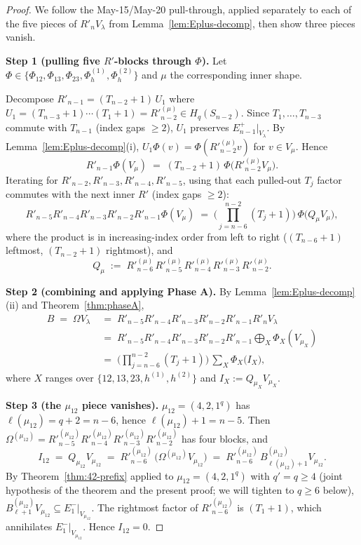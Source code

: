 \documentclass[11pt]{article}
\theoremstyle{definition}
\newcommand{\Hq}{H_q}
\newcommand{\Om}{\Omega}
\newcommand{\Rp}{{R'}}
\begin{document}
\begin{proof}
We follow the May-15/May-20 pull-through, applied separately to each
of the five pieces of $\Rp_n V_\lambda$ from
Lemma~\ref{lem:Eplus-decomp}, then show three pieces vanish.

\medskip\textbf{Step 1 (pulling five $\Rp$-blocks through $\Phi$).}
Let $\Phi \in \{\Phi_{12}, \Phi_{13}, \Phi_{23}, \Phi_h^{(1)},
\Phi_h^{(2)}\}$ and $\mu$ the corresponding inner shape.

Decompose $\Rp_{n-1} = (T_{n-2}+1)\,U_1$ where $U_1 = (T_{n-3}+1)\cdots
(T_1+1) = \Rp_{n-2}^{(\mu)} \in \Hq(S_{n-2})$.  Since $T_1, \ldots,
T_{n-3}$ commute with $T_{n-1}$ (index gaps $\ge 2$), $U_1$ preserves
$E_{n-1}^+|_{V_\lambda}$.  By Lemma~\ref{lem:Eplus-decomp}(i),
$U_1 \Phi(v) = \Phi(\Rp_{n-2}^{(\mu)} v)$ for $v \in V_\mu$.  Hence
\[
   \Rp_{n-1}\Phi(V_\mu)
   \;=\; (T_{n-2}+1)\,\Phi\bigl(\Rp_{n-2}^{(\mu)} V_\mu\bigr).
\]
Iterating for $\Rp_{n-2}, \Rp_{n-3}, \Rp_{n-4}, \Rp_{n-5}$, using
that each pulled-out $T_j$ factor commutes with the next inner $\Rp$
(index gaps $\ge 2$):
\begin{equation}\label{eq:branchpull}
   \Rp_{n-5}\Rp_{n-4}\Rp_{n-3}\Rp_{n-2}\Rp_{n-1}\Phi(V_\mu)
   \;=\; \bigl(\textstyle\prod_{j=n-6}^{n-2}(T_j+1)\bigr)\,
   \Phi\bigl(Q_\mu V_\mu\bigr),
\end{equation}
where the product is in increasing-index order from left to right
($(T_{n-6}+1)$ leftmost, $(T_{n-2}+1)$ rightmost), and
\[
   Q_\mu \;:=\; \Rp_{n-6}^{(\mu)}\,\Rp_{n-5}^{(\mu)}\,\Rp_{n-4}^{(\mu)}\,
                \Rp_{n-3}^{(\mu)}\,\Rp_{n-2}^{(\mu)}.
\]

\medskip\textbf{Step 2 (combining and applying Phase A).}
By Lemma~\ref{lem:Eplus-decomp}(ii) and Theorem~\ref{thm:phaseA},
\begin{align*}
   B \;=\; \Om V_\lambda
   &\;=\; \Rp_{n-5}\Rp_{n-4}\Rp_{n-3}\Rp_{n-2}\Rp_{n-1} \Rp_n V_\lambda \\
   &\;=\; \Rp_{n-5}\Rp_{n-4}\Rp_{n-3}\Rp_{n-2}\Rp_{n-1}
      \!\!\!\bigoplus_{X}\!\!\Phi_X(V_{\mu_X}) \\
   &\;=\; \bigl(\textstyle\prod_{j=n-6}^{n-2}(T_j+1)\bigr)\,
        \sum_{X}\Phi_X\bigl(I_X\bigr),
\end{align*}
where $X$ ranges over $\{12, 13, 23, h^{(1)}, h^{(2)}\}$ and
$I_X := Q_{\mu_X} V_{\mu_X}$.

\medskip\textbf{Step 3 (the $\mu_{12}$ piece vanishes).}
$\mu_{12} = (4, 2, 1^q)$ has $\ell(\mu_{12}) = q + 2 = n - 6$, hence
$\ell(\mu_{12}) + 1 = n - 5$.  Then
$\Om^{(\mu_{12})} = \Rp_{n-5}^{(\mu_{12})}\Rp_{n-4}^{(\mu_{12})}
\Rp_{n-3}^{(\mu_{12})}\Rp_{n-2}^{(\mu_{12})}$ has four blocks, and
\[
   I_{12} \;=\; Q_{\mu_{12}} V_{\mu_{12}}
   \;=\; \Rp_{n-6}^{(\mu_{12})}\,\bigl(\Om^{(\mu_{12})} V_{\mu_{12}}\bigr)
   \;=\; \Rp_{n-6}^{(\mu_{12})}\,B^{(\mu_{12})}_{\ell(\mu_{12})+1} V_{\mu_{12}}.
\]
By Theorem~\ref{thm:42-prefix} applied to $\mu_{12} = (4, 2, 1^q)$
with $q' = q \ge 4$ (joint hypothesis of the theorem and the present
proof; we will tighten to $q \ge 6$ below),
$B^{(\mu_{12})}_{\ell+1} V_{\mu_{12}} \subseteq E_1^-|_{V_{\mu_{12}}}$.
The rightmost factor of $\Rp_{n-6}^{(\mu_{12})}$ is $(T_1+1)$, which
annihilates $E_1^-|_{V_{\mu_{12}}}$.  Hence $I_{12} = 0$.


\end{proof}
\end{document}
